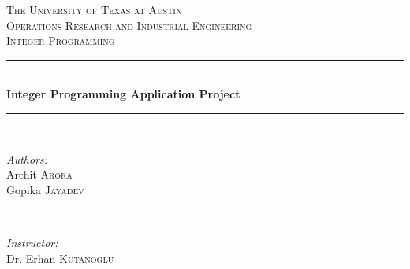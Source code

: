 \documentclass[12pt]{article}
\numberwithin{equation}{section}
\begin{document}
\begin{titlepage}

\newcommand{\HRule}{\rule{\linewidth}{0.5mm}} %

\center %
 

\textsc{\LARGE The University of Texas at Austin}\\[1.5cm] %
\textsc{\Large Operations Research and Industrial Engineering}\\[0.5cm] %
\textsc{\large Integer Programming}\\[0.5cm] %


\HRule \\[0.4cm]
{ \huge \bfseries Integer Programming Application Project}\\[0.4cm] %
\HRule \\[1.5cm]
 

\begin{minipage}{0.4\textwidth}
\begin{flushleft} \large
\emph{Authors:}\\
Archit \textsc{Arora}\\
Gopika \textsc{Jayadev}
\end{flushleft}
\end{minipage}
~
\begin{minipage}{0.4\textwidth}
\begin{flushright} \large
\emph{Instructor:} \\
Dr. Erhan \textsc{Kutanoglu} 
\end{flushright}
\end{minipage}\\[2cm]


\end{titlepage}
\end{document}

